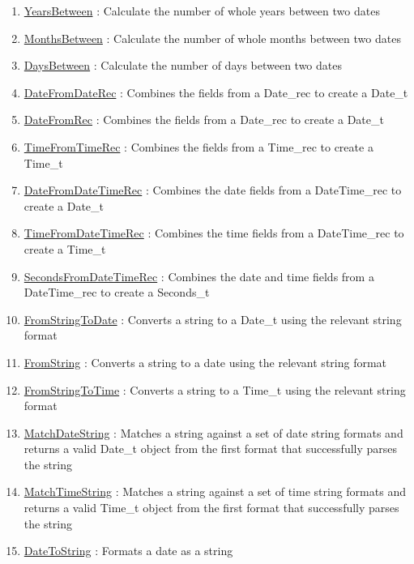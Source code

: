\begin{enumerate}
\item \hyperlink{ecldoc:date.yearsbetween}{YearsBetween}
: Calculate the number of whole years between two dates
\item \hyperlink{ecldoc:date.monthsbetween}{MonthsBetween}
: Calculate the number of whole months between two dates
\item \hyperlink{ecldoc:date.daysbetween}{DaysBetween}
: Calculate the number of days between two dates
\item \hyperlink{ecldoc:date.datefromdaterec}{DateFromDateRec}
: Combines the fields from a Date\_rec to create a Date\_t
\item \hyperlink{ecldoc:date.datefromrec}{DateFromRec}
: Combines the fields from a Date\_rec to create a Date\_t
\item \hyperlink{ecldoc:date.timefromtimerec}{TimeFromTimeRec}
: Combines the fields from a Time\_rec to create a Time\_t
\item \hyperlink{ecldoc:date.datefromdatetimerec}{DateFromDateTimeRec}
: Combines the date fields from a DateTime\_rec to create a Date\_t
\item \hyperlink{ecldoc:date.timefromdatetimerec}{TimeFromDateTimeRec}
: Combines the time fields from a DateTime\_rec to create a Time\_t
\item \hyperlink{ecldoc:date.secondsfromdatetimerec}{SecondsFromDateTimeRec}
: Combines the date and time fields from a DateTime\_rec to create a Seconds\_t
\item \hyperlink{ecldoc:date.fromstringtodate}{FromStringToDate}
: Converts a string to a Date\_t using the relevant string format
\item \hyperlink{ecldoc:date.fromstring}{FromString}
: Converts a string to a date using the relevant string format
\item \hyperlink{ecldoc:date.fromstringtotime}{FromStringToTime}
: Converts a string to a Time\_t using the relevant string format
\item \hyperlink{ecldoc:date.matchdatestring}{MatchDateString}
: Matches a string against a set of date string formats and returns a valid Date\_t object from the first format that successfully parses the string
\item \hyperlink{ecldoc:date.matchtimestring}{MatchTimeString}
: Matches a string against a set of time string formats and returns a valid Time\_t object from the first format that successfully parses the string
\item \hyperlink{ecldoc:date.datetostring}{DateToString}
: Formats a date as a string

\end{enumerate}

